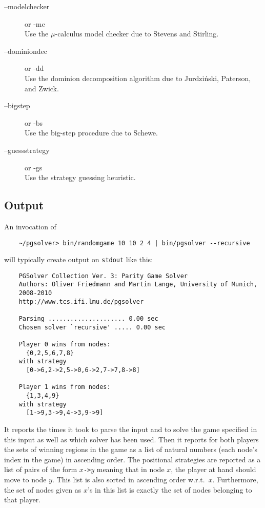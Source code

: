 \begin{description}
\item[{\ttfamily --modelchecker}] \enspace or {\ttfamily -mc}  \\
   Use the $\mu$-calculus model checker due to Stevens and Stirling.

\item[{\ttfamily --dominiondec}] \enspace or {\ttfamily -dd} \\
   Use the dominion decomposition algorithm due to Jurdzi{\'n}ski, Paterson, and Zwick.

\item[{\ttfamily --bigstep}] \enspace or {\ttfamily -bs} \\
   Use the big-step procedure due to Schewe.

\item[{\ttfamily --guessstrategy}] \enspace or {\ttfamily -gs} \\
   Use the strategy guessing heuristic.

\end{description}



\subsection{Output}

An invocation of
\begin{verbatim}
    ~/pgsolver> bin/randomgame 10 10 2 4 | bin/pgsolver --recursive
\end{verbatim}
will typically create output on \texttt{stdout} like this:
\begin{verbatim}
    PGSolver Collection Ver. 3: Parity Game Solver
    Authors: Oliver Friedmann and Martin Lange, University of Munich, 
    2008-2010
    http://www.tcs.ifi.lmu.de/pgsolver

    Parsing ..................... 0.00 sec
    Chosen solver `recursive' ..... 0.00 sec

    Player 0 wins from nodes:
      {0,2,5,6,7,8}
    with strategy
      [0->6,2->2,5->0,6->2,7->7,8->8]

    Player 1 wins from nodes:
      {1,3,4,9}
    with strategy
      [1->9,3->9,4->3,9->9]
\end{verbatim}
It reports the times it took to parse the input and to solve the game specified in this input
as well as which solver has been used. Then it reports for both players the sets of winning
regions in the game as a list of natural numbers (each node's index in the game) in ascending order.
The positional strategies are reported as a list of pairs of the form $x$\texttt{->}$y$ meaning
that in node $x$, the player at hand should move to node $y$. This list is also sorted in
ascending order w.r.t.\ $x$. Furthermore, the set of nodes given as $x$'s in this list is
exactly the set of nodes belonging to that player.




